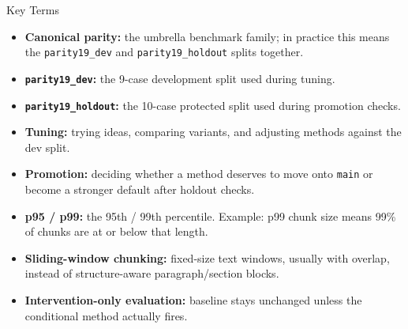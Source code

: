 \documentclass[aspectratio=169]{beamer}
\begin{document}
\begin{frame}{Key Terms}
  \begin{itemize}
    \item \textbf{Canonical parity:} the umbrella benchmark family; in practice this means the \texttt{parity19\_dev} and \texttt{parity19\_holdout} splits together.
    \item \textbf{\texttt{parity19\_dev}:} the 9-case development split used during tuning.
    \item \textbf{\texttt{parity19\_holdout}:} the 10-case protected split used during promotion checks.
    \item \textbf{Tuning:} trying ideas, comparing variants, and adjusting methods against the dev split.
    \item \textbf{Promotion:} deciding whether a method deserves to move onto \texttt{main} or become a stronger default after holdout checks.
    \item \textbf{p95 / p99:} the 95th / 99th percentile. Example: p99 chunk size means 99\% of chunks are at or below that length.
    \item \textbf{Sliding-window chunking:} fixed-size text windows, usually with overlap, instead of structure-aware paragraph/section blocks.
    \item \textbf{Intervention-only evaluation:} baseline stays unchanged unless the conditional method actually fires.
  \end{itemize}
\end{frame}
\end{document}
